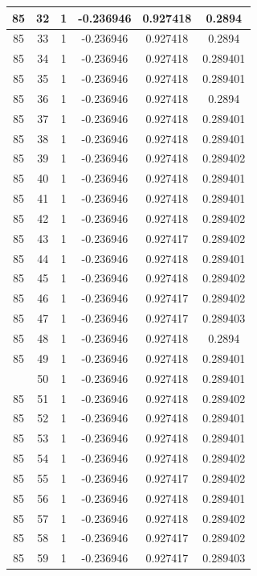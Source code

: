 \documentclass[12pt,a4paper]{article}
\numberwithin{equation}{section}
\numberwithin{figure}{section}
\numberwithin{table}{section}
\begin{document}
\begin{longtable}{|c|c|c|c|c|c|}
85 & 32 & 1 & -0.236946 & 0.927418 & 0.2894 \\ \hline
85 & 33 & 1 & -0.236946 & 0.927418 & 0.2894 \\ \hline
85 & 34 & 1 & -0.236946 & 0.927418 & 0.289401 \\ \hline
85 & 35 & 1 & -0.236946 & 0.927418 & 0.289401 \\ \hline
85 & 36 & 1 & -0.236946 & 0.927418 & 0.2894 \\ \hline
85 & 37 & 1 & -0.236946 & 0.927418 & 0.289401 \\ \hline
85 & 38 & 1 & -0.236946 & 0.927418 & 0.289401 \\ \hline
85 & 39 & 1 & -0.236946 & 0.927418 & 0.289402 \\ \hline
85 & 40 & 1 & -0.236946 & 0.927418 & 0.289401 \\ \hline
85 & 41 & 1 & -0.236946 & 0.927418 & 0.289401 \\ \hline
85 & 42 & 1 & -0.236946 & 0.927418 & 0.289402 \\ \hline
85 & 43 & 1 & -0.236946 & 0.927417 & 0.289402 \\ \hline
85 & 44 & 1 & -0.236946 & 0.927418 & 0.289401 \\ \hline
85 & 45 & 1 & -0.236946 & 0.927418 & 0.289402 \\ \hline
85 & 46 & 1 & -0.236946 & 0.927417 & 0.289402 \\ \hline
85 & 47 & 1 & -0.236946 & 0.927417 & 0.289403 \\ \hline
85 & 48 & 1 & -0.236946 & 0.927418 & 0.2894 \\ \hline
85 & 49 & 1 & -0.236946 & 0.927418 & 0.289401 \\ \hline
\pagebreak
85 & 50 & 1 & -0.236946 & 0.927418 & 0.289401 \\ \hline
85 & 51 & 1 & -0.236946 & 0.927418 & 0.289402 \\ \hline
85 & 52 & 1 & -0.236946 & 0.927418 & 0.289401 \\ \hline
85 & 53 & 1 & -0.236946 & 0.927418 & 0.289401 \\ \hline
85 & 54 & 1 & -0.236946 & 0.927418 & 0.289402 \\ \hline
85 & 55 & 1 & -0.236946 & 0.927417 & 0.289402 \\ \hline
85 & 56 & 1 & -0.236946 & 0.927418 & 0.289401 \\ \hline
85 & 57 & 1 & -0.236946 & 0.927418 & 0.289402 \\ \hline
85 & 58 & 1 & -0.236946 & 0.927417 & 0.289402 \\ \hline
85 & 59 & 1 & -0.236946 & 0.927417 & 0.289403 \\ \hline

\end{longtable}
\end{document}
